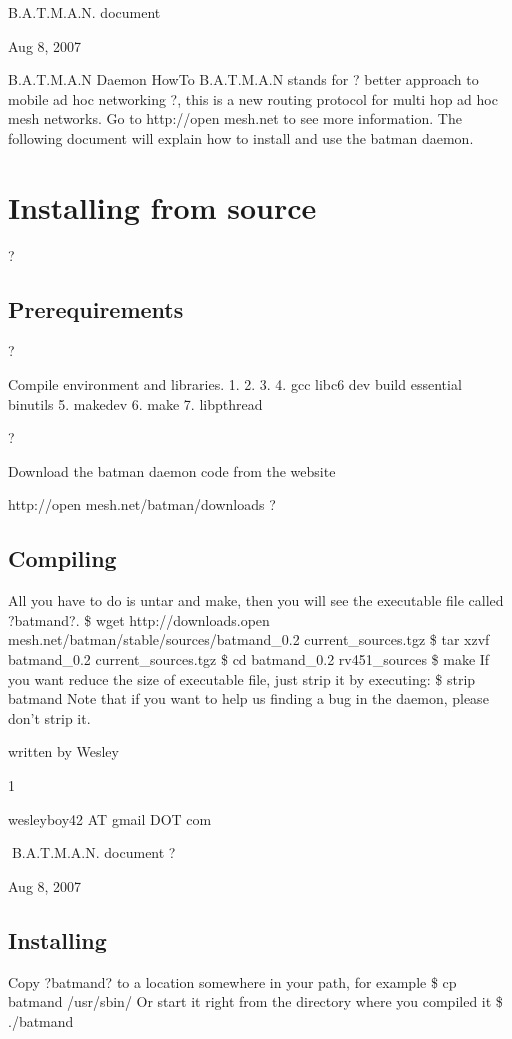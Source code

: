 \documentclass[
	12pt,
	a4paper,
	twoside,
	english,
	headsepline,
	footnosepline,
	automark,
	normalheadings,
	openany,
	cleardoubleplain,
	abstracton,
	idxtotoc,
	liststotoc,
	bibtotoc,
 	BCOR8mm,
]{scrartcl}
\title{\dctitle}
\author{\dcauthorfirstname~\dcauthorlastname}
\begin{document}
\maketitle
B.A.T.M.A.N. document

Aug 8, 2007

B.A.T.M.A.N    Daemon   HowTo
B.A.T.M.A.N stands for ? better approach to mobile ad hoc networking ?, this is a new  routing protocol for multi hop ad hoc mesh networks. Go to http://open mesh.net to see  more information. The following document will explain how to install and use the batman daemon.


\section{Installing from source}
?

\subsection{Prerequirements}
?

Compile environment and libraries. 1. 2. 3. 4. gcc  libc6 dev build essential  binutils 5. makedev 6. make 7. libpthread

?

Download the batman daemon code from the website

 http://open mesh.net/batman/downloads
?

\subsection{Compiling}
All you have to do is untar and make, then you will see the executable file called ?batmand?. \$ wget http://downloads.open mesh.net/batman/stable/sources/batmand\_0.2  current\_sources.tgz \$ tar xzvf batmand\_0.2 current\_sources.tgz \$ cd batmand\_0.2 rv451\_sources \$ make If you want reduce the size of executable file, just strip it by executing:  \$ strip batmand Note that if you want to help us finding a bug in the daemon, please don't strip it.

written by Wesley

1

wesleyboy42 AT gmail DOT com

B.A.T.M.A.N. document
?

Aug 8, 2007

\subsection{Installing}
Copy ?batmand? to a location somewhere in your path, for example \$ cp batmand /usr/sbin/ Or start it right from the directory where you compiled it \$ ./batmand
\end{document}
